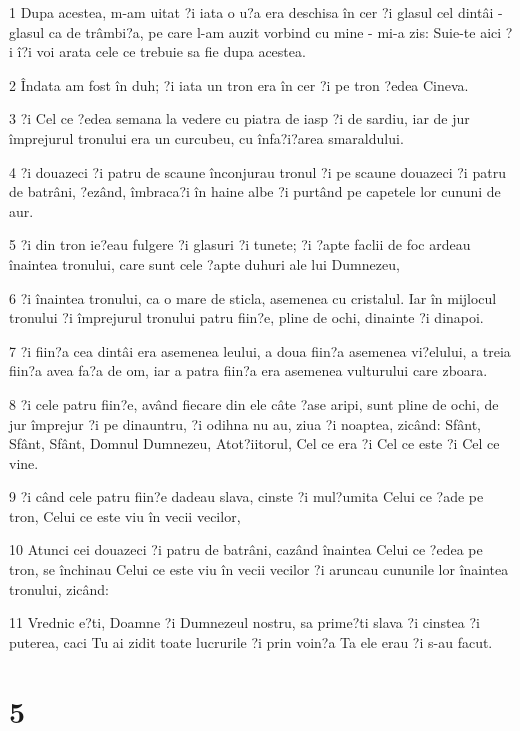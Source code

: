\par 1 Dupa acestea, m-am uitat ?i iata o u?a era deschisa în cer ?i glasul cel dintâi - glasul ca de trâmbi?a, pe care l-am auzit vorbind cu mine - mi-a zis: Suie-te aici ?i î?i voi arata cele ce trebuie sa fie dupa acestea.
\par 2 Îndata am fost în duh; ?i iata un tron era în cer ?i pe tron ?edea Cineva.
\par 3 ?i Cel ce ?edea semana la vedere cu piatra de iasp ?i de sardiu, iar de jur împrejurul tronului era un curcubeu, cu înfa?i?area smaraldului.
\par 4 ?i douazeci ?i patru de scaune înconjurau tronul ?i pe scaune douazeci ?i patru de batrâni, ?ezând, îmbraca?i în haine albe ?i purtând pe capetele lor cununi de aur.
\par 5 ?i din tron ie?eau fulgere ?i glasuri ?i tunete; ?i ?apte faclii de foc ardeau înaintea tronului, care sunt cele ?apte duhuri ale lui Dumnezeu,
\par 6 ?i înaintea tronului, ca o mare de sticla, asemenea cu cristalul. Iar în mijlocul tronului ?i împrejurul tronului patru fiin?e, pline de ochi, dinainte ?i dinapoi.
\par 7 ?i fiin?a cea dintâi era asemenea leului, a doua fiin?a asemenea vi?elului, a treia fiin?a avea fa?a de om, iar a patra fiin?a era asemenea vulturului care zboara.
\par 8 ?i cele patru fiin?e, având fiecare din ele câte ?ase aripi, sunt pline de ochi, de jur împrejur ?i pe dinauntru, ?i odihna nu au, ziua ?i noaptea, zicând: Sfânt, Sfânt, Sfânt, Domnul Dumnezeu, Atot?iitorul, Cel ce era ?i Cel ce este ?i Cel ce vine.
\par 9 ?i când cele patru fiin?e dadeau slava, cinste ?i mul?umita Celui ce ?ade pe tron, Celui ce este viu în vecii vecilor,
\par 10 Atunci cei douazeci ?i patru de batrâni, cazând înaintea Celui ce ?edea pe tron, se închinau Celui ce este viu în vecii vecilor ?i aruncau cununile lor înaintea tronului, zicând:
\par 11 Vrednic e?ti, Doamne ?i Dumnezeul nostru, sa prime?ti slava ?i cinstea ?i puterea, caci Tu ai zidit toate lucrurile ?i prin voin?a Ta ele erau ?i s-au facut.

\chapter{5}

